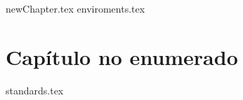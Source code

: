\documentclass[11pt, oneside]{book}
\begin{document}
	\getcover
	\frontmatter
		\getcoverpage
		\tableofcontents
	\mainmatter
	{newChapter.tex}\cleanalldata
	{enviroments.tex}\cleanalldata
	\chapter*{Capítulo no enumerado}
	\appendix
		{standards.tex}\cleanalldata
%	
%	
\end{document}
